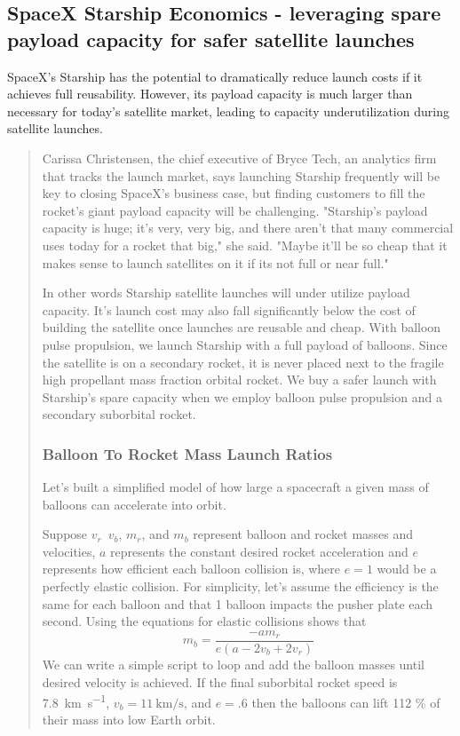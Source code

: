 \documentclass{article}
\begin{document}
\subsection{SpaceX Starship Economics - leveraging spare payload capacity for safer satellite launches}
SpaceX’s Starship has the potential to dramatically reduce launch costs if it achieves full reusability. However, its payload capacity is much larger than necessary for today’s satellite market, leading to capacity underutilization during satellite launches.   \begin{quote}
Carissa Christensen, the chief executive of Bryce Tech, an analytics firm that tracks the launch market, says launching Starship frequently will be key to closing SpaceX’s business case, but finding customers to fill the rocket’s giant payload capacity will be challenging. 
"Starship's payload capacity is huge; it's very, very big, and there aren't that many commercial uses today for a rocket that big," she said.  "Maybe it'll be so cheap that it makes sense to launch satellites on it if its not full or near full." \cite{nyt_starship_size}

In other words Starship satellite launches will under utilize payload capacity.   It's  launch cost may also fall significantly below the cost of building the satellite once launches are reusable and cheap.   With balloon pulse propulsion, we launch Starship with a full payload of balloons.   Since the satellite is on a secondary rocket, it is never placed next to the fragile high propellant mass fraction orbital rocket.   We buy a safer launch with Starship's spare capacity when we employ balloon pulse propulsion and a secondary suborbital rocket.

\subsubsection{Balloon To Rocket Mass Launch Ratios}\label{sec:balloon_rocket_ratio}
Let's built a simplified model of how large a spacecraft a given mass of balloons can accelerate into orbit.

Suppose \(v_r\)\,  \(v_b\),  \(m_r\), and \(m_b\) represent balloon and rocket masses and velocities,    \(a\) represents the constant desired rocket acceleration and \(e\) represents how efficient each balloon collision is, where \(e=1\) would be a perfectly elastic collision.   For simplicity, let's assume the efficiency is the same for each balloon and that 1 balloon impacts the pusher plate each second.   Using the equations for elastic collisions shows that 
\begin{equation}
m_b=\frac{-am_r}{e(a - 2v_b + 2v_r)}
\label{eq:balloon_mass}
\end{equation}
We can write a simple script to loop and add the balloon masses until desired velocity is achieved.   If the final suborbital rocket speed is \SI{7.8}{\kilo\metre\per\second}, \(v_b=\SI{11}{\kilo\metre\per\second}\), and \(e=.6\) then the balloons can lift 112 \% of their mass into low Earth orbit.   


\end{quote}
\end{document}

